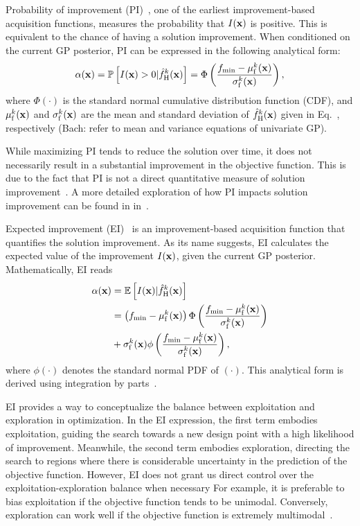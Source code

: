 \documentclass[iicol,sn-basic]{sn-jnl}%
\theoremstyle{thmstyleone}%
\theoremstyle{thmstyletwo}
\theoremstyle{thmstylethree}
\newcommand\myNote[1]{\textcolor{red!50!black}{(Bach: #1})}
\begin{document}
\begin{linenumbers}
Probability of improvement (PI)~\citep{Kushner1964}, one of the earliest improvement-based acquisition functions, measures the probability that $I({\bf x})$ is positive.
This is equivalent to the chance of having a solution improvement.
When conditioned on the current GP posterior, PI can be expressed in the following analytical form:
\begin{equation}\label{Eq42}
	\alpha({\bf x}) = \mathbb{P}\left[I({\bf x})>0|\hat{f}_\text{H}^k({\bf x})\right]=\Phi\left(\frac{f_\text{min}-\mu_\text{f}^k({\bf x})}{\sigma_\text{f}^k({\bf x})}\right),
\end{equation}
where $\Phi(\cdot)$ is the standard normal cumulative distribution function (CDF), and $\mu_\text{f}^k({\bf x})$ and $\sigma_\text{f}^k({\bf x})$ are the mean and standard deviation of $\hat{f}_\text{H}^k({\bf x})$ given in Eq.~, respectively \myNote{refer to mean and variance equations of univariate GP}.

While maximizing PI tends to reduce the solution over time, it does not necessarily result in a substantial improvement in the objective function.
This is due to the fact that PI is not a direct quantitative measure of solution improvement~\citep{Kochenderfer2019}.
A more detailed exploration of how PI impacts solution improvement can be found in in~\cite{Jones2001}.

Expected improvement (EI)~\citep{Mockus1975,Jones1998} is an improvement-based acquisition function that quantifies the solution improvement.
As its name suggests, EI calculates the expected value of the improvement $I({\bf x})$, given the current GP posterior.
Mathematically, EI reads
\begin{equation}\label{Eq43}
	\begin{aligned}
		\alpha({\bf x}) & = \mathbb{E}\left[I({\bf x})|\hat{f}_\text{H}^k({\bf x})\right]\\
		& =\left( f_\text{min}-\mu_\text{f}^k({\bf x})\right)\Phi\left(\frac{f_\text{min}-\mu_\text{f}^k({\bf x})}{\sigma_\text{f}^k({\bf x})}\right)\\
		&+\sigma_\text{f}^k({\bf x})\phi\left(\frac{f_\text{min}-\mu_\text{f}^k({\bf x})}{\sigma_\text{f}^k({\bf x})}\right),
	\end{aligned}
\end{equation}
where $\phi(\cdot)$ denotes the standard normal PDF of $(\cdot)$.
This analytical form is derived using integration by parts~\citep{Jones1998,Kochenderfer2019}.

EI provides a way to conceptualize the balance between exploitation and exploration in optimization.
In the EI expression, the first term embodies exploitation, guiding the search towards a new design point with a high likelihood of improvement.
Meanwhile, the second term embodies exploration, directing the search to regions where there is considerable uncertainty in the prediction of the objective function.
However, EI does not grant us direct control over the exploitation-exploration balance when necessary
For example, it is preferable to bias exploitation if the objective function tends to be unimodal. Conversely, exploration can work well if the objective function is extremely multimodal~\citep{Sobester2005}.


\end{linenumbers}
\end{document}

